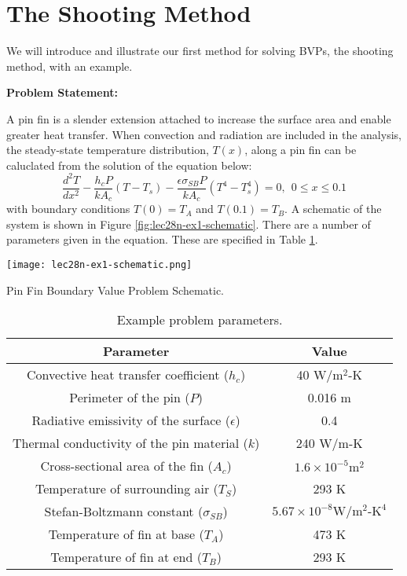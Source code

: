 \section{The Shooting Method}
We will introduce and illustrate our first method for solving BVPs, the shooting method, with an example.

\vspace{0.25cm}

\noindent\textbf{Problem Statement:}

\vspace{0.1cm}

\noindent A pin fin is a slender extension attached to increase the surface area and enable greater heat transfer.  When convection and radiation are included in the analysis, the steady-state temperature distribution, $T(x)$, along a pin fin can be caluclated from the solution of the equation below:
\begin{equation}
\frac{d^2T}{dx^2} - \frac{h_cP}{kA_c}\left(T - T_s\right)-\frac{\epsilon \sigma_{SB}P}{k A_c}\left(T^4 - T_s^4 \right) = 0, \ \ 0 \le x \le 0.1
\end{equation}
with boundary conditions $T(0)=T_A$ and $T(0.1)=T_B$.  A schematic of the system is shown in Figure \ref{fig:lec28n-ex1-schematic}.  There are a number of parameters given in the equation.  These are specified in Table \ref{tab:lec28n-ex1-parameters}.
\begin{marginfigure}[-4.5cm]
\texttt{[image: lec28n-ex1-schematic.png]}
\caption{Pin Fin Boundary Value Problem Schematic.}
\label{fig:lec28n-ex1-schematic}
\end{marginfigure}

\begin{table}
\begin{tabular}{|c|c|}
\hline
\textbf{Parameter} & \textbf{Value} \\ \hline
Convective heat transfer coefficient ($h_c$) & 40 $\text{W}/\text{m}^2\text{-K}$ \\ \hline
Perimeter of the pin ($P$) & 0.016 m \\ \hline
Radiative emissivity of the surface ($\epsilon$) & 0.4 \\ \hline
Thermal conductivity of the pin material ($k$) & 240 $\text{W}/\text{m-K}$ \\ \hline
Cross-sectional area of the fin ($A_c$) & $1.6 \times 10^{-5} \text{m}^2$ \\ \hline
Temperature of surrounding air ($T_S$) & 293 K \\ \hline
Stefan-Boltzmann constant ($\sigma_{SB}$) & $5.67 \times 10^{-8} \text{W}/\text{m}^2\text{-K}^4$ \\ \hline
Temperature of fin at base ($T_A$) & 473 K \\ \hline
Temperature of fin at end ($T_B$) & 293 K \\ \hline
\end{tabular}
\caption{Example problem parameters.}
\label{tab:lec28n-ex1-parameters}
\end{table}

